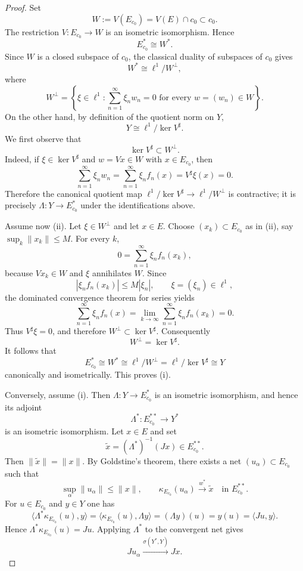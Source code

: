 \documentclass[10pt,a4paper]{amsart}
\begin{document}
\begin{proof}
Set
\[
        W:=V(E_{c_0})=V(E)\cap c_0\subset c_0.
\]
The restriction $V:E_{c_0}\to W$ is an isometric isomorphism. Hence
\[
        E_{c_0}^*\cong W^*.
\]
Since $W$ is a closed subspace of $c_0$, the classical duality of subspaces
of $c_0$ gives
\[
        W^*\cong \ell^1/W^\perp,
\]
where
\[
        W^\perp=\left\{\xi\in\ell^1:
        \sum_{n=1}^\infty \xi_n w_n=0\text{ for every }w=(w_n)\in W
        \right\}.
\]
On the other hand, by definition of the quotient norm on $Y$,
\[
        Y\cong \ell^1/\ker V^\sharp.
\]
We first observe that
\[
        \ker V^\sharp\subset W^\perp.
\]
Indeed, if $\xi\in\ker V^\sharp$ and $w=Vx\in W$ with $x\in E_{c_0}$, then
\[
        \sum_{n=1}^\infty \xi_n w_n
        =\sum_{n=1}^\infty \xi_n f_n(x)
        =V^\sharp\xi(x)=0.
\]
Therefore the canonical quotient map
$\ell^1/\ker V^\sharp\to \ell^1/W^\perp$ is contractive; it is precisely
$\Lambda:Y\to E_{c_0}^*$ under the identifications above.

Assume now \textup{(ii)}. Let $\xi\in W^\perp$ and let $x\in E$. Choose
$(x_k)\subset E_{c_0}$ as in \textup{(ii)}, say $\sup_k\|x_k\|\le M$. For
every $k$,
\[
        0=\sum_{n=1}^\infty \xi_n f_n(x_k),
\]
because $Vx_k\in W$ and $\xi$ annihilates $W$. Since
\[
        |\xi_n f_n(x_k)|\le M|\xi_n|,
        \qquad \xi=(\xi_n)\in \ell^1,
\]
the dominated convergence theorem for series yields
\[
        \sum_{n=1}^\infty \xi_n f_n(x)
        =\lim_{k\to\infty}\sum_{n=1}^\infty \xi_n f_n(x_k)=0.
\]
Thus $V^\sharp\xi=0$, and therefore $W^\perp\subset \ker V^\sharp$.
Consequently
\[
        W^\perp=\ker V^\sharp.
\]
It follows that
\[
        E_{c_0}^*\cong W^*\cong \ell^1/W^\perp
        =\ell^1/\ker V^\sharp\cong Y
\]
canonically and isometrically. This proves \textup{(i)}.

Conversely, assume \textup{(i)}. Then
$\Lambda:Y\to E_{c_0}^*$ is an isometric isomorphism, and hence its adjoint
\[
        \Lambda^*:E_{c_0}^{**}\longrightarrow Y^*
\]
is an isometric isomorphism. Let $x\in E$ and set
\[
        \widetilde x=(\Lambda^*)^{-1}(Jx)\in E_{c_0}^{**}.
\]
Then $\|\widetilde x\|=\|x\|$. By Goldstine's theorem, there exists a net
$(u_\alpha)\subset E_{c_0}$ such that
\[
        \sup_\alpha\|u_\alpha\|\le \|x\|,
        \qquad
        \kappa_{E_{c_0}}(u_\alpha)\xrightarrow{w^*}\widetilde x
        \quad\text{in }E_{c_0}^{**}.
\]
For $u\in E_{c_0}$ and $y\in Y$ one has
\[
        \langle \Lambda^*\kappa_{E_{c_0}}(u),y\rangle
        =\langle \kappa_{E_{c_0}}(u),\Lambda y\rangle
        =(\Lambda y)(u)=y(u)=\langle Ju,y\rangle.
\]
Hence $\Lambda^*\kappa_{E_{c_0}}(u)=Ju$. Applying $\Lambda^*$ to the
convergent net gives
\[
        Ju_\alpha\xrightarrow{\sigma(Y^*,Y)}Jx.
\]


\end{proof}
\end{document}
